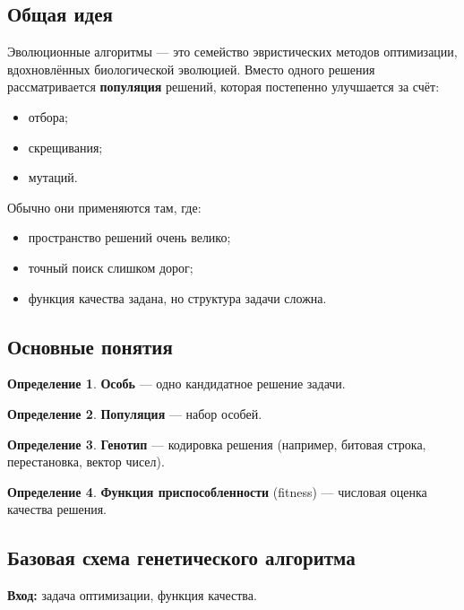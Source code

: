\documentclass[12pt,a4paper]{article}
\theoremstyle{definition}
\newtheorem{definition}{Определение}[section]
\theoremstyle{plain}
\begin{document}
\subsection{Общая идея}
Эволюционные алгоритмы --- это семейство эвристических методов оптимизации, вдохновлённых биологической эволюцией. Вместо одного решения рассматривается \textbf{популяция} решений, которая постепенно улучшается за счёт:
\begin{itemize}
\item отбора;
\item скрещивания;
\item мутаций.
\end{itemize}

Обычно они применяются там, где:
\begin{itemize}
\item пространство решений очень велико;
\item точный поиск слишком дорог;
\item функция качества задана, но структура задачи сложна.
\end{itemize}

\subsection{Основные понятия}
\begin{definition}
\textbf{Особь} --- одно кандидатное решение задачи.
\end{definition}

\begin{definition}
\textbf{Популяция} --- набор особей.
\end{definition}

\begin{definition}
\textbf{Генотип} --- кодировка решения (например, битовая строка, перестановка, вектор чисел).
\end{definition}

\begin{definition}
\textbf{Функция приспособленности} (fitness) --- числовая оценка качества решения.
\end{definition}

\subsection{Базовая схема генетического алгоритма}
\textbf{Вход:} задача оптимизации, функция качества.
\end{document}
